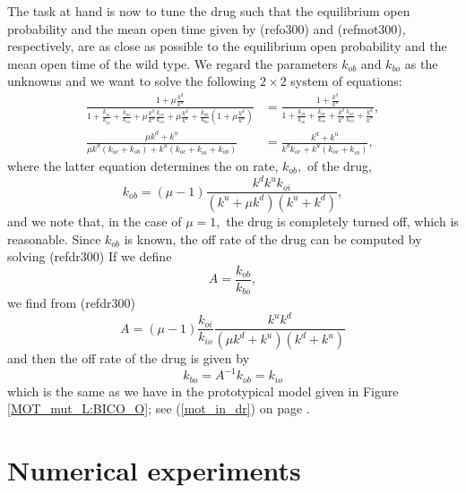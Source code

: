 The task at hand is now to tune the drug such that the equilibrium open
probability and the mean open time given by (ref{o300}) and
(ref{mot300}), respectively, are as close as possible to the equilibrium open
probability and the mean open time of the wild type. We regard the parameters
$k_{ob}$ and $k_{bo}$ as the unknowns and we want to solve the following
$2\times2$ system of equations:
\begin{align}
\frac{1+\mu\frac{k^{d}}{k^{u}}}{1+\frac{k_{oi}}{k_{io}}+\frac{k_{oc}}{k_{co}
}+\mu\frac{k^{d}}{k^{u}}\frac{k_{oc}}{k_{co}}+\mu\frac{k^{d}}{k^{u}}
+\frac{k_{ob}}{k_{bo}}\left(  1+\mu\frac{k^{d}}{k^{u}}\right)  }  &  =\frac
{1+\frac{k^{d}}{k^{u}}}{1+\frac{k_{oi}}{k_{io}}+\frac{k_{oc}}{k_{co}}+\frac{k^{d}}{k^{u}}
\frac{k_{oc}}{k_{co}}+\frac{k^{d}}{k^{u}}},\label{dr300}\\
\frac{\mu k^{d}+k^{u}}{\mu k^{d}\left(  k_{oc}+k_{ob}\right)  +k^{u}\left(
k_{oc}+k_{oi}+k_{ob}\right)  }  &  =\frac{k^{d}+k^{u}}{k^{d}k_{oc}
+k^{u}\left(  k_{oc}+k_{oi}\right)  }, \label{dr301}
\end{align}
where the latter equation determines the on rate, $k_{ob},$ of the drug,
\begin{equation}
k_{ob}=\left(  \mu-1\right)  \frac{k^{d}k^{u}k_{oi}}{\left(  k^{u}+\mu
k^{d}\right)  \left(  k^{u}+k^{d}\right)  }, \label{kob300}
\end{equation}
and we note that, in the case of $\mu=1,$ the  drug is completely turned off,
which is reasonable. Since $k_{ob}$ is known, the off rate of the drug can be
computed by solving (ref{dr300}) If we define
\begin{equation}
A=\frac{k_{ob}}{k_{bo}},
\end{equation}
we find from (ref{dr300})  
\begin{equation}
A=(\mu-1)\frac{k_{oi}}{k_{io}}  \frac{k^{u}k^{d}}{\left(  \mu k^{d}+k^{u}\right)  \left(  k^{d}
+k^{u}\right)  \label{Akbo}}
\end{equation}
and then the off rate of the drug is given by
\begin{equation}
k_{bo}=A^{-1}k_{ob}=k_{io} \label{kbo300}
\end{equation}
which is the same as we have in the prototypical model given in 
Figure \ref{MOT_mut_L:BICO_O}; see (\ref{mot_in_dr}) on page \pageref{mot_in_dr}.


\bigskip

\section{Numerical experiments}

